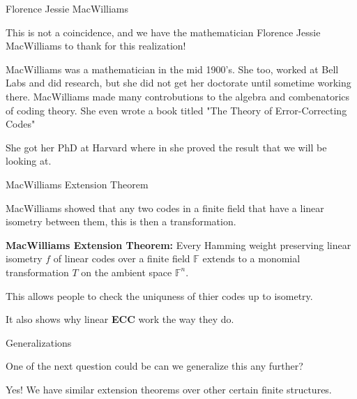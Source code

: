 \documentclass{beamer}
\begin{document}
\begin{frame}{Florence Jessie MacWilliams}
    
    This is not a coincidence, and we have the mathematician Florence Jessie MacWilliams to thank for
    this realization!

    \medskip
    
    \pause

    MacWilliams was a mathematician in the mid 1900's. She too, worked at Bell Labs and did research,
    but she did not get her doctorate until sometime working there. MacWilliams made many controbutions
    to the algebra and combenatorics of coding theory. She even wrote a book titled "The Theory of
    Error-Correcting Codes"
    
    \bigskip

    She got her PhD at Harvard where in she proved the result that we will be looking at.

\end{frame}

\begin{frame}{MacWilliams Extension Theorem}

    MacWilliams showed that any two codes in a finite field that have a linear isometry between them,
    this is then a transformation.

    \bigskip
    
    \textbf{MacWilliams Extension Theorem:} Every Hamming weight preserving linear isometry $f$ of
    linear codes over a finite field $\mathbb{F}$ extends to a monomial transformation $T$ on the
    ambient space $\mathbb{F}^n$.

\end{frame}

\begin{frame}
    
    This allows people to check the uniquness of thier codes up to isometry.

    \medskip

    It also shows why linear \textbf{ECC} work the way they do.

\end{frame}

\begin{frame}{Generalizations}
    
    One of the next question could be can we generalize this any further?

    \bigskip

    \pause

    Yes! We have similar extension theorems over other certain finite structures.

\end{frame}
\end{document}
